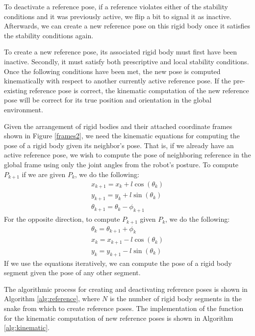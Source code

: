 To deactivate a reference pose, if a reference violates either of the stability conditions and it was previously active, we flip a bit to signal it as inactive.  Afterwards, we can create a new reference pose on this rigid body once it satisfies the stability conditions again.

To create a new reference pose, its associated rigid body must first have been inactive.  Secondly, it must satisfy both prescriptive and local stability conditions.  Once the following conditions have been met, the new pose is computed kinematically with respect to another currently active reference pose.  If the pre-existing reference pose is correct, the kinematic computation of the new reference pose will be correct for its true position and orientation in the global environment.

Given the arrangement of rigid bodies and their attached coordinate frames shown in Figure \ref{frames2}, we need the kinematic equations for computing the pose of a rigid body given its neighbor's pose.  That is, if we already have an active reference pose, we wish to compute the pose of neighboring reference in the global frame using only the joint angles from the robot's posture.  To compute $P_{k+1}$ if we are given $P_k$, we do the following:
\begin{equation}
\begin{array}{l}
\displaystyle x_{k+1} = x_k + l \cos(\theta_k) \\
\displaystyle y_{k+1} = y_k + l \sin(\theta_k) \\
\displaystyle \theta_{k+1} = \theta_k - \phi_{k+1}
\end{array}
\label{kinem1}
\end{equation}
For the opposite direction, to compute $P_{k+1}$ given $P_k$, we do the following:
\begin{equation}
\begin{array}{l}
\displaystyle \theta_k = \theta_{k+1} + \phi_k \\
\displaystyle x_k = x_{k+1} - l \cos(\theta_k) \\ 
\displaystyle y_k = y_{k+1} - l \sin(\theta_k)
\end{array}
\label{kinem2}
\end{equation}
If we use the equations iteratively, we can compute the pose of a rigid body segment given the pose of any other segment. 

The algorithmic process for creating and deactivating reference poses is shown in Algorithm \ref{alg:reference}, where $N$ is the number of rigid body segments in the snake from which to create reference poses.  The implementation of the function for the kinematic computation of new reference poses is shown in Algorithm \ref{alg:kinematic}.


